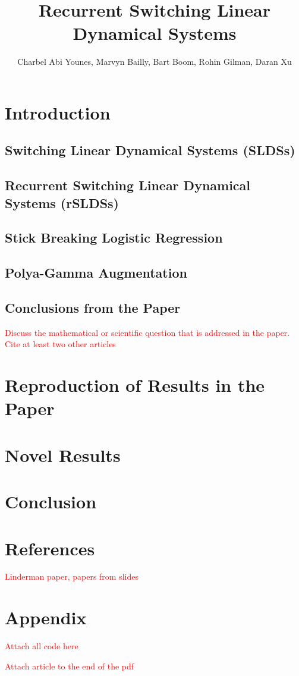 \documentclass{article}
\title{Recurrent Switching Linear Dynamical Systems}
\author{Charbel Abi Younes, Marvyn Bailly, Bart Boom, Rohin Gilman, Daran Xu}
\date{}
\begin{document}
\maketitle

\section{Introduction}

\subsection{Switching Linear Dynamical Systems (SLDSs)}

\subsection{Recurrent Switching Linear Dynamical Systems (rSLDSs)}

\subsection{Stick Breaking Logistic Regression}

\subsection{Polya-Gamma Augmentation}

\subsection{Conclusions from the Paper}

\textcolor{red}{Discuss the mathematical or scientific question that is addressed in the paper. Cite at least two other articles}

\section{Reproduction of Results in the Paper}

\section{Novel Results}

\section{Conclusion}

\section{References}

\textcolor{red}{Linderman paper, papers from slides}

\section{Appendix}

\textcolor{red}{Attach all code here}

\textcolor{red}{Attach article to the end of the pdf}
\end{document}
